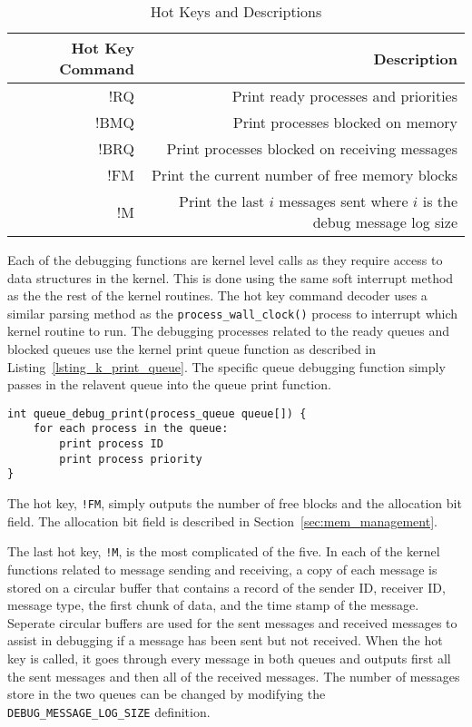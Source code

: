 \documentclass[oneside]{report}
\begin{document}
\begin{table}[h]
    \caption{Hot Keys and Descriptions}
    \label{hot_keys_table}
    \begin{tabular}{| r | r |}
        \hline
        Hot Key Command & Description \\
        \hline
        !RQ & Print ready processes and priorities \\ 
        !BMQ & Print processes blocked on memory \\ 
        !BRQ & Print processes blocked on receiving messages \\ 
        !FM & Print the current number of free memory blocks \\ 
        !M & Print the last $i$ messages sent where $i$ is the debug message
        log size \\
        \hline
    \end{tabular}
\end{table}

Each of the debugging functions are kernel level calls as they require access
to data structures in the kernel. This is done using the same soft interrupt
method as the the rest of the kernel routines. The hot key command decoder
uses a similar parsing method as the \texttt{process\_wall\_clock()} process to
interrupt which kernel routine to run. The debugging processes related to the
ready queues and blocked queues use the kernel print queue function as
described in Listing~\ref{lsting_k_print_queue}. The specific queue debugging 
function simply passes in the relavent queue into the queue print function.

\begin{lstlisting}
int queue_debug_print(process_queue queue[]) {
    for each process in the queue:
        print process ID
        print process priority
}
\end{lstlisting}

The hot key, \texttt{!FM}, simply outputs the number of free blocks and the
allocation bit field. The allocation bit field is described in
Section~\ref{sec:mem_management}.

The last hot key, \texttt{!M}, is the most complicated of the five. In each of
the kernel functions related to message sending and receiving, a copy of each
message is stored on a circular buffer that contains a record of the sender ID,
receiver ID, message type, the first chunk of data, and the time stamp of the
message. Seperate circular buffers are used for the sent messages and received
messages to assist in debugging if a message has been sent but not received.
When the hot key is called, it goes through every message in both queues and 
outputs first all the sent messages and then all of the received messages. The
number of messages store in the two queues can be changed by modifying the
\texttt{DEBUG\_MESSAGE\_LOG\_SIZE} definition.
\end{document}
